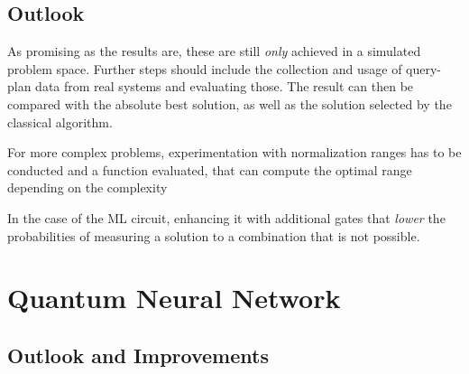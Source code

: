 \subsection{Outlook}
As promising as the results are, these are still \emph{only} achieved in a simulated problem space. Further steps should include the collection and usage of query-plan data from real systems and evaluating those. The result can then be compared with the absolute best solution, as well as the solution selected by the classical algorithm. \par
For more complex problems, experimentation with normalization ranges has to be conducted and a function evaluated, that can compute the optimal range depending on the complexity\par
In the case of the ML circuit, enhancing it with additional gates that \emph{lower} the probabilities of measuring a solution to a combination that is not possible.

\newpage

\section{Quantum Neural Network}

\subsection{Outlook and Improvements}

